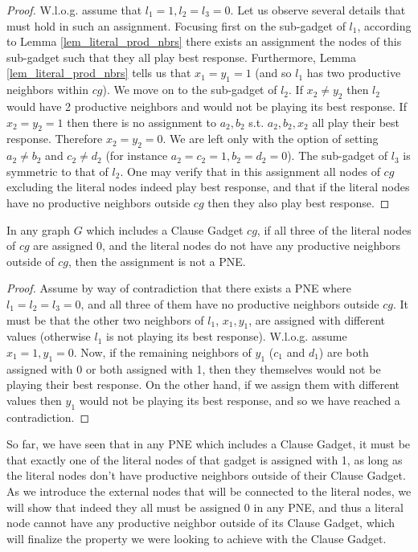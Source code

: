 \documentclass[runningheads]{llncs}
\begin{document}
\begin{proof}
W.l.o.g. assume that $l_1=1, l_2=l_3=0$. Let us observe several details that must hold in such an assignment. Focusing first on the sub-gadget of $l_1$, according to Lemma \ref{lem_literal_prod_nbrs} there exists an assignment the nodes of this sub-gadget such that they all play best response. Furthermore, Lemma \ref{lem_literal_prod_nbrs} tells us that $x_1=y_1=1$ (and so $l_1$ has two productive neighbors within $cg$).
We move on to the sub-gadget of $l_2$. If $x_2\ne y_2$ then $l_2$ would have 2 productive neighbors and would not be playing its best response. If $x_2=y_2=1$ then there is no assignment to $a_2,b_2$ s.t. $a_2,b_2,x_2$ all play their best response. Therefore $x_2=y_2=0$. We are left only with the option of setting $a_2\ne b_2$ and $c_2\ne d_2$ (for instance $a_2=c_2=1, b_2=d_2=0$).
The sub-gadget of $l_3$ is symmetric to that of $l_2$.
One may verify that in this assignment all nodes of $cg$ excluding the literal nodes indeed play best response, and that if the literal nodes have no productive neighbors outside $cg$ then they also play best response.
\end{proof}

\begin{lemma}
\label{lem_all_literals_0}
In any graph $G$ which includes a Clause Gadget $cg$, if all three of the literal nodes of $cg$ are assigned 0, and the literal nodes do not have any productive neighbors outside of $cg$, then the assignment is not a PNE.
\end{lemma}

\begin{proof}
Assume by way of contradiction that there exists a PNE where $l_1=l_2=l_3=0$, and all three of them have no productive neighbors outside $cg$. It must be that the other two neighbors of $l_1$, $x_1,y_1$, are assigned with different values (otherwise $l_1$ is not playing its best response). W.l.o.g. assume $x_1=1,y_1=0$. Now, if the remaining neighbors of $y_1$ ($c_1$ and $d_1$) are both assigned with 0 or both assigned with 1, then they themselves would not be playing their best response. On the other hand, if we assign them with different values then $y_1$ would not be playing its best response, and so we have reached a contradiction.
\end{proof}

So far, we have seen that in any PNE which includes a Clause Gadget, it must be that exactly one of the literal nodes of that gadget is assigned with 1, as long as the literal nodes don't have productive neighbors outside of their Clause Gadget. As we introduce the external nodes that will be connected to the literal nodes, we will show that indeed they all must be assigned 0 in any PNE, and thus a literal node cannot have any productive neighbor outside of its Clause Gadget, which will finalize the property we were looking to achieve with the Clause Gadget.
\end{document}
